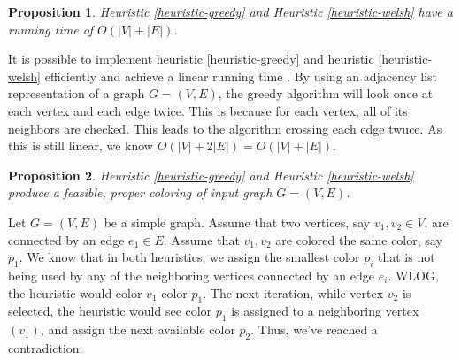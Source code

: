 \documentclass{article}
\newcounter{heuristic} \setcounter{heuristic}{0}
\newtheorem{prop}{Proposition}
\theoremstyle{definition}
\begin{document}
\newpage

\begin{prop}
Heuristic \ref{heuristic-greedy} and Heuristic \ref{heuristic-welsh} have a running time of $O(|V| + |E|)$.
\end{prop}

It is possible to implement heuristic \ref{heuristic-greedy} and heuristic \ref{heuristic-welsh} efficiently and achieve a linear running time \cite{kubale}. By using an adjacency list representation of a graph \(G = (V, E)\), the greedy algorithm will look once at each vertex and each edge twice. This is because for each vertex, all of its neighbors are checked. This leads to the algorithm crossing each edge twuce. As this is still linear, we know \(O(|V| + 2|E|) = O(|V| + |E|)\).

\begin{prop}
Heuristic \ref{heuristic-greedy} and Heuristic \ref{heuristic-welsh} produce a feasible, proper coloring of input graph \(G = (V, E)\).
\end{prop}

Let \(G = (V, E)\) be a simple graph. Assume that two vertices, say \(v_1, v_2 \in V\), are connected by an edge \(e_1 \in E\). Assume that \(v_1, v_2\) are colored the same color, say \(p_1\). We know that in both heuristics, we assign the smallest color \(p_i\) that is not being used by any of the neighboring vertices connected by an edge \(e_i\). WLOG, the heuristic would color \(v_1\) color \(p_1\). The next iteration, while vertex \(v_2\) is selected, the heuristic would see color \(p_1\) is assigned to a neighboring vertex \((v_1)\), and assign the next available color \(p_2\). Thus, we've reached a contradiction.
\end{document}
